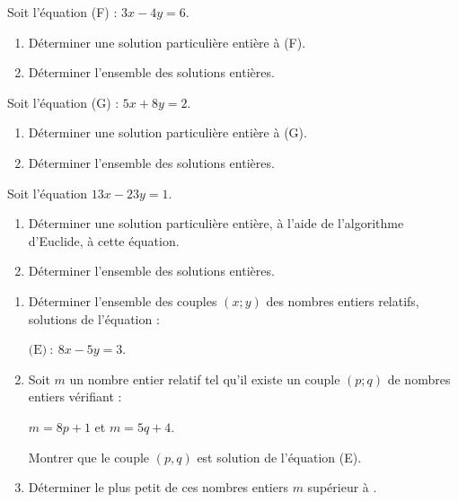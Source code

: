 \documentclass{cornouaille}
\begin{document}
\begin{exercice}
Soit l'équation (F) : $3x - 4y = 6$.
\begin{enumerate}
\item Déterminer une solution particulière entière à (F).
\item Déterminer l'ensemble des solutions entières.
\end{enumerate}
\end{exercice}

\begin{exercice}
Soit l'équation (G) : $5x + 8y = 2$.
\begin{enumerate}
\item Déterminer une solution particulière entière à (G).
\item Déterminer l'ensemble des solutions entières.
\end{enumerate}
\end{exercice}

\begin{exercice}
Soit l'équation $13x - 23y = 1$.
\begin{enumerate}
\item Déterminer une solution particulière entière, à l'aide de
  l'algorithme d'Euclide, à cette équation.
\item Déterminer l'ensemble des solutions entières.
\end{enumerate}
\end{exercice}

\begin{exercice}
\begin{enumerate}
\item Déterminer l'ensemble des couples $(x; y)$ des nombres entiers
  relatifs, solutions de l'équation :

{\centering $\text{(E)}~:~8x - 5y = 3$.\par}

\item Soit $m$ un nombre entier relatif tel qu'il existe un couple
  $(p; q)$ de nombres entiers vérifiant :

$m=8p + 1$ et $m = 5q + 4$.

Montrer que le couple $(p, q)$ est solution de l'équation (E).

\item Déterminer le plus petit de ces nombres entiers $m$ supérieur à
  .
\end{enumerate}
\end{exercice}
\end{document}
